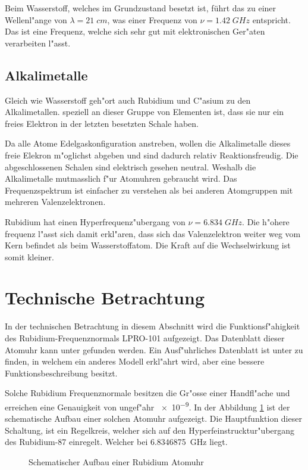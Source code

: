 \begin{refsection}
Beim Wasserstoff, welches im Grundzustand besetzt ist, führt das zu einer Wellenl"ange von $\lambda = 21\;cm$, was einer Frequenz von $\nu = 1.42\;GHz $ entspricht. Das ist eine Frequenz, welche sich sehr gut mit elektronischen Ger"aten verarbeiten l"asst. 

\subsection{Alkalimetalle}
Gleich wie Wasserstoff geh"ort auch Rubidium und C"asium zu den Alkalimetallen. speziell an dieser Gruppe von Elementen ist, dass sie nur ein freies Elektron in der letzten besetzten Schale haben. 

Da alle Atome Edelgaskonfiguration anstreben, wollen die Alkalimetalle dieses freie Elekron m"oglichst abgeben und sind dadurch relativ Reaktionsfreudig. 
Die abgeschlossenen Schalen sind elektrisch gesehen neutral. 
Weshalb die Alkalimetalle mutmasslich f"ur Atomuhren gebraucht wird. 
Das Frequenzspektrum ist einfacher zu verstehen als bei anderen Atomgruppen mit mehreren Valenzelektronen.

Rubidium hat einen Hyperfrequenz"ubergang von $\nu = 6.834\;GHz$. Die h"ohere frequenz l"asst sich damit erkl"aren, dass sich das Valenzelektron weiter weg vom Kern befindet als beim Wasserstoffatom. Die Kraft auf die Wechselwirkung ist somit kleiner. 

\section{Technische Betrachtung}
In der technischen Betrachtung in diesem Abschnitt wird die
Funktionsf"ahigkeit des Rubidium-Frequenznormals LPRO-101 aufgezeigt.
Das Datenblatt dieser Atomuhr kann unter \cite{datasheet:lpro}
gefunden werden.  Ein Ausf"uhrliches Datenblatt ist unter
\cite{datasheet:prs10m} zu finden, in welchem ein anderes Modell
erkl"ahrt wird, aber eine bessere Funktionsbeschreibung besitzt.

Solche Rubidium Frequenznormale besitzen die Gr"osse einer
Handfl"ache und erreichen eine Genauigkeit von ungef"ahr \num{e-9}.
In der Abbildung \ref{fig:techBlock} ist der schematische Aufbau einer
solchen Atomuhr aufgezeigt.  Die Hauptfunktion dieser Schaltung, ist
ein Regelkreis, welcher sich auf den Hyperfeinstrucktur"ubergang des
Rubidium-87 einregelt.  Welcher bei \SI{6.8346875}{\giga\hertz}
liegt.

\begin{figure}
  \centering
  
  \caption{Schematischer Aufbau einer Rubidium Atomuhr}
  \label{fig:techBlock}
\end{figure}


\end{refsection}
